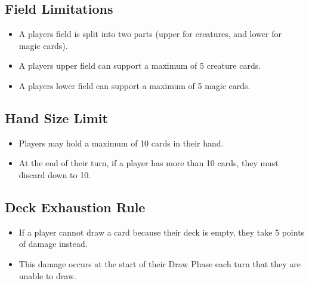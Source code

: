 \subsection{Field Limitations}
\begin{itemize}
    \item A players field is split into two parts (upper for creatures, and lower for magic cards).
    \item A players upper field can support a maximum of 5 creature cards.
    \item A players lower field can support a maximum of 5 magic cards.
\end{itemize}








\subsection{Hand Size Limit}
\begin{itemize}
    \item Players may hold a maximum of 10 cards in their hand.
    \item At the end of their turn, if a player has more than 10 cards, they must discard down to 10.
\end{itemize}







\subsection{Deck Exhaustion Rule}
\begin{itemize}
    \item If a player cannot draw a card because their deck is empty, they take 5 points of damage instead.
    \item This damage occurs at the start of their Draw Phase each turn that they are unable to draw.
\end{itemize}




